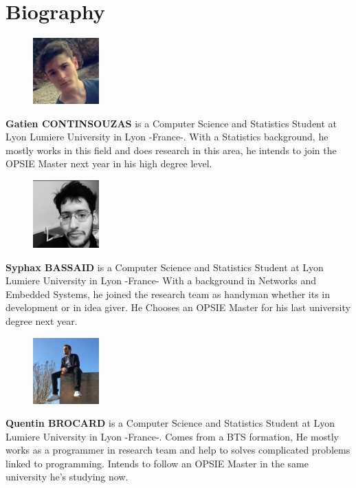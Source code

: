 \documentclass[times, twoside]{zHenriquesLab-StyleBioRxiv}
\begin{document}
\section*{Biography}
\begin{figure}
\begin{center}
    \includegraphics[width=1in, hight=1.50in,clip]{Figures/Gatien.jpg}
\end{center}
\end{figure}\par
  \textbf{Gatien CONTINSOUZAS} is a Computer Science and Statistics Student at Lyon Lumiere University in Lyon -France-. With a Statistics background, he mostly works in this field and does research in this area, he intends to join the OPSIE Master next year in his high degree level.
  \newline
  
  \begin{figure}
  \begin{center}
    \includegraphics[width=1in, hight=1.50in,clip]{Figures/Syphax.png}
      \end{center}
\end{figure}\par
  \textbf{Syphax BASSAID} is a Computer Science and Statistics Student at Lyon Lumiere University in Lyon -France- With a background in Networks and Embedded Systems, he joined the research team as handyman whether its in development or in idea giver. He Chooses an OPSIE Master for his last university degree next year. 
 \newline
  
   \begin{figure}
  \begin{center}
    \includegraphics[width=1in, hight=1.50in,clip]{Figures/Quentin.jpg}
      \end{center}
\end{figure}\par
  \textbf{Quentin BROCARD} is a Computer Science and Statistics Student at Lyon Lumiere University in Lyon -France-. Comes from a BTS formation, He mostly works as a programmer in research team and help to solves complicated problems linked to programming. Intends to follow an OPSIE Master in the same university he's studying now.
  \newline
  
\end{document}

